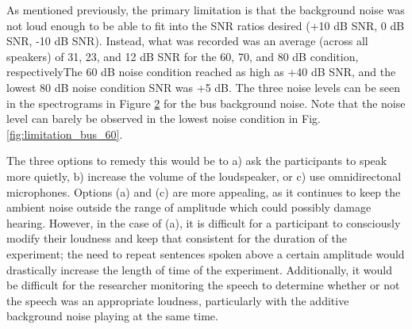 \begin{figure}[H]
\begin{center}
\begin{subfigure}{0.475\textwidth}
  \caption{}
  \label{fig:limitation_bus_80}
\end{subfigure}
\end{center}
\caption{}
\label{fig:noise_level_limitation}
\end{figure}

\DIFaddend As mentioned previously, the primary limitation is that the background noise was not loud enough to be able to fit into the SNR ratios desired (+10 dB SNR, 0 dB SNR, -10 dB SNR).  Instead, what was recorded was an average (across all speakers) of 31, 23, and 12 dB SNR for the 60, 70, and 80 dB condition, respectively\DIFdelbegin \DIFdel{; }\DIFdelend \DIFaddbegin {}\DIFaddend The 60 dB noise condition reached as high as +40 dB SNR, and the lowest 80 dB noise condition SNR was +5 dB. The three noise levels can be seen in the spectrograms in Figure \ref{fig:noise_level_limitation} for the bus background noise.  Note that the noise level can barely be observed in the lowest noise condition in Fig. \ref{fig:limitation_bus_60}.

The three options to remedy this would be to a) ask the participants to speak more quietly, b) increase the volume of the loudspeaker, or c) use omnidirectonal microphones.  Options (a) and (c) are more appealing, as it continues to keep the ambient noise outside the range of amplitude which could possibly damage hearing.  However, in the case of (a), it is difficult for a participant to consciously modify their loudness and keep that consistent for the duration of the experiment; the need to repeat sentences spoken above a certain amplitude would drastically increase the length of time of the experiment.  Additionally, it would be difficult for the researcher monitoring the speech to determine whether or not the speech was an appropriate loudness, particularly with the additive background noise playing at the same time.  

